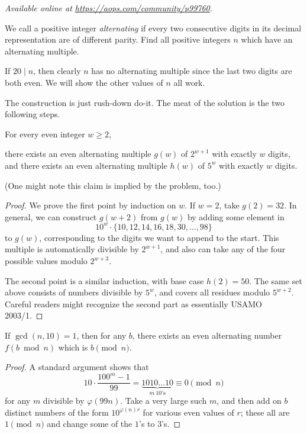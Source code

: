 
\textsl{Available online at \url{https://aops.com/community/p99760}.}
\begin{mdframed}[style=mdpurplebox,frametitle={Problem statement}]
We call a positive integer \emph{alternating} if every two consecutive digits
in its decimal representation are of different parity.
Find all positive integers $n$ which have an alternating multiple.
\end{mdframed}
If $20 \mid n$, then clearly $n$ has no alternating
multiple since the last two digits are both even.
We will show the other values of $n$ all work.

The construction is just rush-down do-it.
The meat of the solution is the two following steps.
\begin{claim*}
  For every even integer $w \ge 2$,
  \begin{itemize}
    \ii there exists an even alternating multiple $g(w)$ of $2^{w+1}$
    with exactly $w$ digits, and
    \ii there exists an even alternating multiple $h(w)$ of $5^{w}$
    with exactly $w$ digits.
  \end{itemize}
\end{claim*}
(One might note this claim is implied by the problem, too.)
\begin{proof}
  We prove the first point by induction on $w$.
  If $w = 2$, take $g(2) = 32$.
  In general, we can construct $g(w+2)$ from $g(w)$
  by adding some element in
  \[ 10^w \cdot \{10, 12, 14, 16, 18, 30, \dots, 98\} \]
  to $g(w)$, corresponding to the digits
  we want to append to the start.
  This multiple is automatically divisible by $2^{w+1}$,
  and also can take any of the four possible values modulo $2^{w+3}$.

  The second point is a similar induction,
  with base case $h(2) = 50$.
  The same set above consists of numbers divisible by $5^w$,
  and covers all residues modulo $5^{w+2}$.
  Careful readers might recognize the second part
  as essentially USAMO 2003/1.
\end{proof}

\begin{claim*}
  If $\gcd(n,10) = 1$, then for any $b$,
  there exists an even alternating number $f(b \bmod n)$ which is
  $b \pmod n$.
\end{claim*}
\begin{proof}
  A standard argument shows that
  \[ 10 \cdot \frac{100^m-1}{99}
    = \underbrace{1010\dots10}_{m\ 10\text{'s}}
    \equiv 0 \pmod n \]
  for any $m$ divisible by $\varphi(99n)$.
  Take a very large such $m$,
  and then add on $b$ distinct numbers of the form $10^{\varphi(n)r}$
  for various even values of $r$; these all are $1 \pmod n$
  and change some of the $1$'s to $3$'s.
\end{proof}


